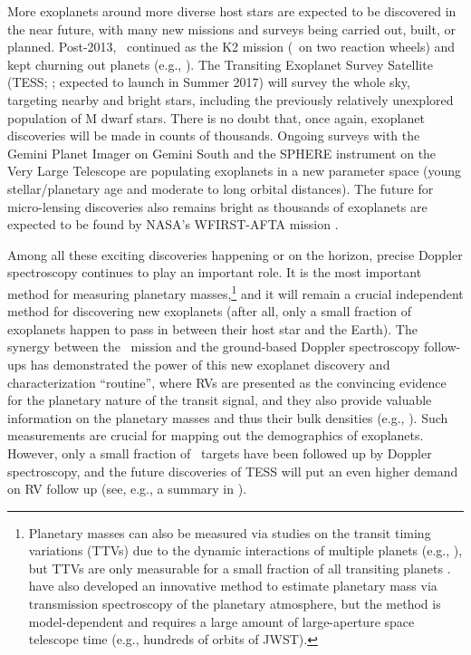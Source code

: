 More exoplanets around more diverse host stars are expected to be
discovered in the near future, with many new missions and surveys
being carried out, built, or planned. Post-2013, \kepler\ continued as
the K2 mission (\kepler\ on two reaction wheels) and kept churning out
planets (e.g., \citealt{2016ApJS..222...14V}). The Transiting
Exoplanet Survey Satellite (TESS; \citealt{2014SPIE.9143E..20R};
expected to launch in Summer 2017) will survey the whole sky,
targeting nearby and bright stars, including the previously relatively
unexplored population of M dwarf stars. There is no doubt that, once
again, exoplanet discoveries will be made in counts of
thousands. Ongoing surveys with the Gemini Planet Imager on Gemini
South \citep{2014PNAS..11112661M} and the SPHERE instrument on the
Very Large Telescope \citep{2008SPIE.7014E..18B} are populating
exoplanets in a new parameter space (young stellar/planetary age and
moderate to long orbital distances). The future for micro-lensing
discoveries also remains bright as thousands of exoplanets are
expected to be found by NASA's WFIRST-AFTA mission
\citep{2014arXiv1409.2759Y}.

Among all these exciting discoveries happening or on the horizon,
precise Doppler spectroscopy continues to play an important role. It
is the most important method for measuring planetary
masses,\footnote{Planetary masses can also be measured via studies on
the transit timing variations (TTVs) due to the dynamic interactions
of multiple planets (e.g., \citealt{2016ApJ...820...39J}), but TTVs
are only measurable for a small fraction of all transiting planets
\citep{mazeh2013}. \cite{2013Sci...342.1473D} have also developed an
innovative method to estimate planetary mass via transmission
spectroscopy of the planetary atmosphere, but the method is
model-dependent and requires a large amount of large-aperture space
telescope time (e.g., hundreds of orbits of JWST).} and it will remain
a crucial independent method for discovering new exoplanets (after
all, only a small fraction of exoplanets happen to pass in between
their host star and the Earth). The synergy between the \kepler\
mission and the ground-based Doppler spectroscopy follow-ups has
demonstrated the power of this new exoplanet discovery and
characterization ``routine'', where RVs are presented as the
convincing evidence for the planetary nature of the transit signal,
and they also provide valuable information on the planetary masses and
thus their bulk densities (e.g., \citealt{marcy2014}). Such
measurements are crucial for mapping out the demographics of
exoplanets. However, only a small fraction of \kepler\ targets have
been followed up by Doppler spectroscopy, and the future discoveries
of TESS will put an even higher demand on RV follow up (see, e.g.,
a summary in \citealt{exopag2015}).

